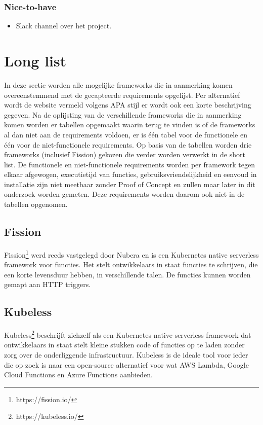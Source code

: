 \subsubsection{Nice-to-have}
\begin{itemize}
    \item Slack channel over het project.
\end{itemize}

\section{Long list}
In deze sectie worden alle mogelijke frameworks die in aanmerking komen overeenstemmend met de gecapteerde requirements opgelijst. Per alternatief wordt de website vermeld volgens APA stijl er wordt ook een korte beschrijving gegeven. Na de oplijsting van de verschillende frameworks die in aanmerking komen worden er tabellen opgemaakt waarin terug te vinden is of de frameworks al dan niet aan de requirements voldoen, er is één tabel voor de functionele en één voor de niet-functionele requirements. Op basis van de tabellen worden drie frameworks (inclusief Fission) gekozen die verder worden verwerkt in de short list. De functionele en niet-functionele requirements worden per framework tegen elkaar afgewogen, executietijd van functies, gebruiksvriendelijkheid en eenvoud in installatie zijn niet meetbaar zonder Proof of Concept en zullen maar later in dit onderzoek worden gemeten. Deze requirements worden daarom ook niet in de tabellen opgenomen.

\subsection{Fission}
Fission\footnote{https://fission.io/} werd reeds vastgelegd door Nubera en is een Kubernetes native serverless framework voor functies. Het stelt ontwikkelaars in staat functies te schrijven, die een korte levensduur hebben, in verschillende talen. De functies kunnen worden gemapt aan HTTP triggers.

\subsection{Kubeless}
Kubeless\footnote{https://kubeless.io/} beschrijft zichzelf als een Kubernetes native serverless framework dat ontwikkelaars in staat stelt kleine stukken code of functies op te laden zonder zorg over de onderliggende infrastructuur. Kubeless is de ideale tool voor ieder die op zoek is naar een open-source alternatief voor wat AWS Lambda, Google Cloud Functions en Azure Functions aanbieden.

